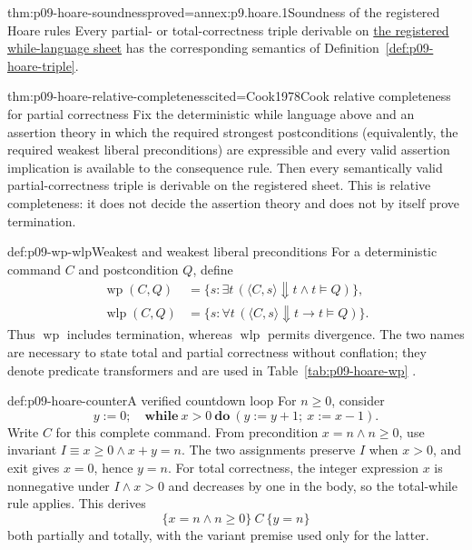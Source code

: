 \begin{hbtheorem}{thm:p09-hoare-soundness}{proved=annex:p9.hoare.1}{Soundness of the registered Hoare rules}
Every partial- or total-correctness triple derivable on
\hyperref[sheet:hoare-while]{the registered while-language sheet} has the
corresponding semantics of Definition~\ref{def:p09-hoare-triple}.
\end{hbtheorem}

\begin{hbtheorem}{thm:p09-hoare-relative-completeness}{cited=Cook1978}{Cook relative completeness for partial correctness}
Fix the deterministic while language above and an assertion theory in which
the required strongest postconditions (equivalently, the required weakest
liberal preconditions) are expressible and every valid assertion implication
is available to the consequence rule.  Then every semantically valid
partial-correctness triple is derivable on the registered sheet.  This is
relative completeness: it does not decide the assertion theory and does not
by itself prove termination.
\end{hbtheorem}

\begin{hbdefinition}{def:p09-wp-wlp}{Weakest and weakest liberal preconditions}
For a deterministic command \(C\) and postcondition \(Q\), define
\[
\begin{aligned}
 \operatorname{wp}(C,Q)
   &=\{s:\exists t\,(\langle C,s\rangle\Downarrow t\land t\models Q)\},\\
 \operatorname{wlp}(C,Q)
   &=\{s:\forall t\,(\langle C,s\rangle\Downarrow t\to t\models Q)\}.
\end{aligned}
\]
Thus \(\operatorname{wp}\) includes termination, whereas
\(\operatorname{wlp}\) permits divergence.  The two names are necessary to
state total and partial correctness without conflation; they denote predicate
transformers and are used in Table~\ref{tab:p09-hoare-wp}
\cite{Dijkstra1975}.
\end{hbdefinition}

\begin{hbexample}{def:p09-hoare-counter}{A verified countdown loop}
For \(n\geq0\), consider
\[
 y:=0;\quad
 \mathbf{while}\ x>0\ \mathbf{do}\
   (y:=y+1;\ x:=x-1).
\]
Write \(C\) for this complete command.
From precondition \(x=n\land n\geq0\), use invariant
\(I\equiv x\geq0\land x+y=n\).  The two assignments preserve \(I\) when
\(x>0\), and exit gives \(x=0\), hence \(y=n\).  For total correctness, the
integer expression \(x\) is nonnegative under \(I\land x>0\) and decreases by
one in the body, so the total-while rule applies.  This derives
\[
 \{x=n\land n\geq0\}\ C\ \{y=n\}
\]
both partially and totally, with the variant premise used only for the latter.
\end{hbexample}

